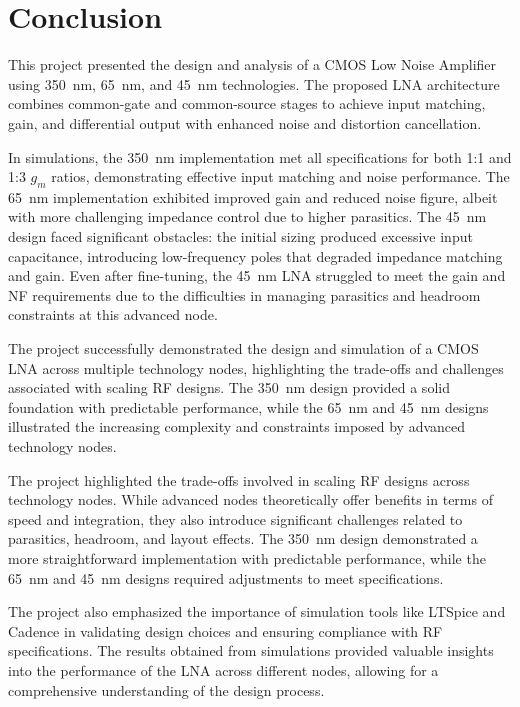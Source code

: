 \section{Conclusion}

This project presented the design and analysis of a CMOS Low Noise Amplifier using 350~nm, 65~nm, and 45~nm technologies. The proposed LNA architecture combines common-gate and common-source stages to achieve input matching, gain, and differential output with enhanced noise and distortion cancellation.

In simulations, the 350~nm implementation met all specifications for both 1:1 and 1:3 $g_m$ ratios, demonstrating effective input matching and noise performance. The 65~nm implementation exhibited improved gain and reduced noise figure, albeit with more challenging impedance control due to higher parasitics. The 45~nm design faced significant obstacles: the initial sizing produced excessive input capacitance, introducing low-frequency poles that degraded impedance matching and gain. Even after fine-tuning, the 45~nm LNA struggled to meet the gain and NF requirements due to the difficulties in managing parasitics and headroom constraints at this advanced node.

The project successfully demonstrated the design and simulation of a CMOS LNA across multiple technology nodes, highlighting the trade-offs and challenges associated with scaling RF designs. The 350~nm design provided a solid foundation with predictable performance, while the 65~nm and 45~nm designs illustrated the increasing complexity and constraints imposed by advanced technology nodes.

The project highlighted the trade-offs involved in scaling RF designs across technology nodes. While advanced nodes theoretically offer benefits in terms of speed and integration, they also introduce significant challenges related to parasitics, headroom, and layout effects. The 350~nm design demonstrated a more straightforward implementation with predictable performance, while the 65~nm and 45~nm designs required adjustments to meet specifications.

The project also emphasized the importance of simulation tools like LTSpice and Cadence in validating design choices and ensuring compliance with RF specifications. The results obtained from simulations provided valuable insights into the performance of the LNA across different nodes, allowing for a comprehensive understanding of the design process.